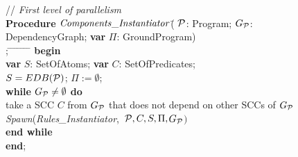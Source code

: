 \documentclass[preprint]{tlp}
\newcommand{\gpii}{\mbox{$\Pi$}}
\newcommand{\p}{\ensuremath{{\cal P}}\xspace}
\newcommand{\dgp}{\mbox{$G_{\p}$}}
\begin{document}
\begin{figure}[t!]
\begin{center}
\begin{small}
\begin{tabbing}

// {\em First level of parallelism}\\
{\bf Procedure} $\mathit{Components\_Instantiator \/}$(\= $\p$: Program;
$\dgp$: DependencyGraph; {\bf var} $\gpii$: GroundProgram)\\;
\hspace*{0.2cm} \= \kill
\hspace*{0.4cm} \= \hspace*{0.4cm} \= \hspace*{0.4cm} \=
\hspace*{0.4cm} \= \hspace*{0.4cm} \= \hspace*{3cm} \=\kill
{\bf begin} \\
\> {\bf var} $S$: SetOfAtoms; {\bf var} $C$: SetOfPredicates;\\
\> $S = EDB(\p)$; $\gpii := \emptyset$; \\
\> {\bf while} $\dgp \neq \emptyset$ {\bf do}  \hspace{0.7 cm}{\em // until there are components to be processed} \\
\>\> take a SCC $C$ from $\dgp$ that does not depend on other SCCs  of $\dgp$    \\
\>\> {\em Spawn}({\em Rules\_Instantiator},\ $\p,C,S,\gpii,$\dgp$)$\\
\> {\bf end while} \\
{\bf end}; \\

\\


\end{tabbing}
\end{small}
\end{center}
\end{figure}
\end{document}
